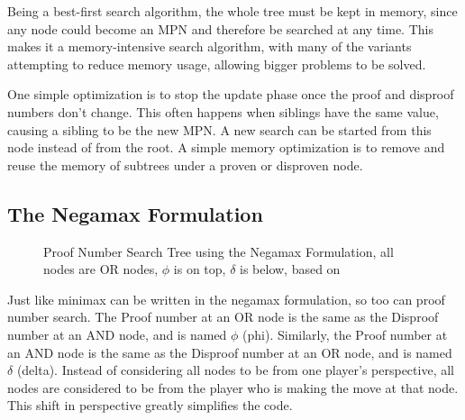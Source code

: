 Being a best-first search algorithm, the whole tree must be kept in memory, since any node could become an MPN and therefore be searched at any time. This makes it a memory-intensive search algorithm, with many of the variants attempting to reduce memory usage, allowing bigger problems to be solved.

One simple optimization is to stop the update phase once the proof and disproof numbers don't change. This often happens when siblings have the same value, causing a sibling to be the new MPN. A new search can be started from this node instead of from the root. A simple memory optimization is to remove and reuse the memory of subtrees under a proven or disproven node.

\subsection{The Negamax Formulation} \label{sec:NegaPDS}

\begin{figure}
\centering
{}
\caption[Proof Number Search Tree using the Negamax Formulation]{Proof Number Search Tree using the Negamax Formulation, all nodes are OR nodes, $\phi$ is on top, $\delta$ is below, based on \cite{winands2003-PDS-PN}}
\label{fig:negamaxtree}
\end{figure}

Just like minimax can be written in the negamax formulation, so too can proof number search. The Proof number at an OR node is the same as the Disproof number at an AND node, and is named $\phi$ (phi). Similarly, the Proof number at an AND node is the same as the Disproof number at an OR node, and is named $\delta$ (delta). Instead of considering all nodes to be from one player's perspective, all nodes are considered to be from the player who is making the move at that node. This shift in perspective greatly simplifies the code.

